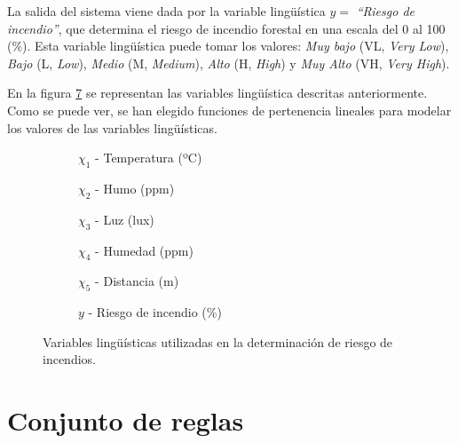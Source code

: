 La salida del sistema viene dada por la variable lingüística $y = $ \emph{``Riesgo de incendio''}, que determina el riesgo de incendio forestal en una escala del 0 al 100 (\%). Esta variable lingüística puede tomar los valores: \emph{Muy bajo} (VL, \emph{Very Low}), \emph{Bajo} (L, \emph{Low}), \emph{Medio} (M, \emph{Medium}), \emph{Alto} (H, \emph{High}) y \emph{Muy Alto} (VH, \emph{Very High}). 

En la figura \ref{fig:fire-detection-lang-variables} se representan las variables lingüística descritas anteriormente. Como se puede ver, se han elegido funciones de pertenencia lineales para modelar los valores de las variables lingüísticas.

\begin{figure}[t]
	\centering
	\begin{subfigure}[b]{0.45\textwidth}
		\setlength\figureheight{2.5cm}
		\setlength\figurewidth{6cm}
		
		\caption{$\chi_1$ - Temperatura (ºC)}
		\label{fig:temp-lang-variable}
	\end{subfigure}
	\qquad
	\begin{subfigure}[b]{0.45\textwidth}
		\setlength\figureheight{2.5cm}
		\setlength\figurewidth{6cm}
		
		\caption{$\chi_2$ - Humo (ppm)}
		\label{fig:smoke-lang-variable}
	\end{subfigure}
	
	\vspace{1 cm}
	\begin{subfigure}[b]{0.45\textwidth}
		\setlength\figureheight{2.5cm}
		\setlength\figurewidth{6cm}
		
		\caption{$\chi_3$ - Luz (lux)}
		\label{fig:light-lang-variable}
	\end{subfigure}
	\qquad
	\begin{subfigure}[b]{0.45\textwidth}
		\setlength\figureheight{2.5cm}
		\setlength\figurewidth{6cm}
		
		\caption{$\chi_4$ - Humedad (ppm)}
		\label{fig:humidity-lang-variable}
	\end{subfigure}
	
	\vspace{1 cm}
	\begin{subfigure}[b]{0.45\textwidth}
		\setlength\figureheight{2.5cm}
		\setlength\figurewidth{6cm}
		
		\caption{$\chi_5$ - Distancia (m)}
		\label{fig:distance-lang-variable}
	\end{subfigure}
	\qquad
	\begin{subfigure}[b]{0.45\textwidth}
		\setlength\figureheight{2.5cm}
		\setlength\figurewidth{6cm}
		
		\caption{$y$ - Riesgo de incendio (\%)}
		\label{fig:threat-lang-variable}
	\end{subfigure}
	\caption{Variables lingüísticas utilizadas en la determinación de riesgo de incendios.}
	\label{fig:fire-detection-lang-variables}
\end{figure}

\section{Conjunto de reglas}


